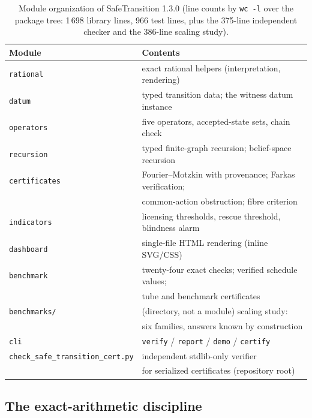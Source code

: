 \documentclass[3p,11pt]{elsarticle}
\begin{document}
\begin{table}[t]
\centering
\small
\begin{tabular}{@{}ll@{}}
\toprule
Module & Contents \\
\midrule
\texttt{rational} & exact rational helpers (interpretation, rendering) \\
\texttt{datum} & typed transition data; the witness datum instance \\
\texttt{operators} & five operators, accepted-state sets, chain check \\
\texttt{recursion} & typed finite-graph recursion; belief-space recursion \\
\texttt{certificates} & Fourier--Motzkin with provenance; Farkas verification; \\
                       & common-action obstruction; fibre criterion \\
\texttt{indicators} & licensing thresholds, rescue threshold, blindness alarm \\
\texttt{dashboard} & single-file HTML rendering (inline SVG/CSS) \\
\texttt{benchmark} & twenty-four exact checks; verified schedule values; \\
                       & tube and benchmark certificates \\
\texttt{benchmarks/} & (directory, not a module) scaling study: \\
                       & six families, answers known by construction \\
\texttt{cli} & \texttt{verify} / \texttt{report} / \texttt{demo} / \texttt{certify} \\
\texttt{check\_safe\_transition\_cert.py} & independent stdlib-only verifier \\
                       & for serialized certificates (repository root) \\
\bottomrule
\end{tabular}
\caption{Module organization of SafeTransition 1.3.0 (line counts by
\texttt{wc~-l} over the package tree: 1\,698 library lines, 966 test
lines, plus the 375-line independent checker and the 386-line scaling
study).}
\label{tab:modules}
\end{table}

\subsection{The exact-arithmetic discipline}\label{sec:exactness}
\end{document}
